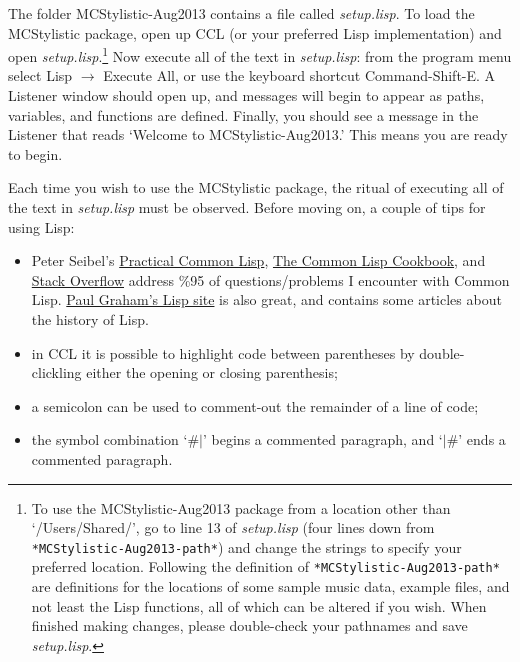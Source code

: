 The folder MCStylistic-Aug2013 contains a file called \emph{setup.lisp}. To load the MCStylistic package, open up CCL (or your preferred Lisp implementation) and open \emph{setup.lisp}.\footnote{To use the MCStylistic-Aug2013 package from a location other than `/Users/Shared/', go to line 13 of \emph{setup.lisp} (four lines down from \texttt{*MCStylistic-Aug2013-path*}) and change the strings to specify your preferred location. Following the definition of \texttt{*MCStylistic-Aug2013-path*} are definitions for the locations of some sample music data, example files, and not least the Lisp functions, all of which can be altered if you wish. When finished making changes, please double-check your pathnames and save \emph{setup.lisp}.} Now execute all of the text in \emph{setup.lisp}: from the program menu select Lisp $\rightarrow$ Execute All, or use the keyboard shortcut Command-Shift-E. A Listener window should open up, and messages will begin to appear as paths, variables, and functions are defined. Finally, you should see a message in the Listener that reads `Welcome to MCStylistic-Aug2013.' This means you are ready to begin.

Each time you wish to use the MCStylistic package, the ritual of executing all of the text in \emph{setup.lisp} must be observed. Before moving on, a couple of tips for using Lisp:
\begin{itemize}
\item Peter Seibel's \href{http://www.gigamonkeys.com/book/}{Practical Common Lisp}, \href{http://cl-cookbook.sourceforge.net/}{The Common Lisp Cookbook}, and \href{http://stackoverflow.com/}{Stack Overflow} address \%95 of questions/problems I encounter with Common Lisp. \href{http://www.paulgraham.com/lisp.html}{Paul Graham's Lisp site} is also great, and contains some articles about the history of Lisp.
\item in CCL it is possible to highlight code between parentheses by double-clickling either the opening or closing parenthesis;
\item a semicolon can be used to comment-out the remainder of a line of code;
\item the symbol combination `\#$|$' begins a commented paragraph, and `$|$\#' ends a commented paragraph.
\end{itemize}


